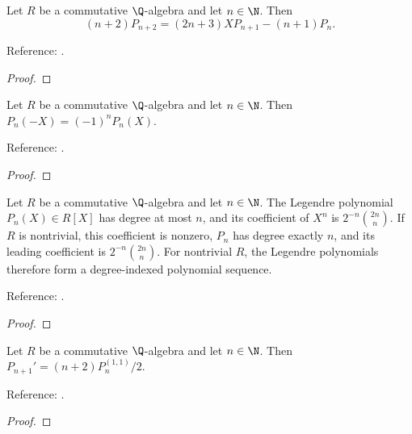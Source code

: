 \begin{theorem}
\label{thm:legendre-recurrence}
\leanok
Let $R$ be a commutative $\Q$-algebra and let $n\in\N$. Then\[(n+2)P_{n+2}=(2n+3)XP_{n+1}-(n+1)P_n.\]

Reference: \cite[18.9.1]{dlmf}.
\end{theorem}
\begin{proof}
\leanok
\end{proof}

\begin{theorem}
\label{thm:legendre-parity}
\leanok
Let $R$ be a commutative $\Q$-algebra and let $n\in\N$. Then $P_n(-X)=(-1)^nP_n(X)$.

Reference: \cite[Table 18.6.1]{dlmf}.
\end{theorem}
\begin{proof}
\leanok
\end{proof}

\begin{theorem}
\label{thm:legendre-degree}
\leanok
Let $R$ be a commutative $\Q$-algebra and let $n\in\N$.
The Legendre polynomial $P_n(X)\in R[X]$ has degree at most $n$, and its coefficient of $X^n$ is
$2^{-n}\binom{2n}{n}$.
If $R$ is nontrivial, this coefficient is nonzero, $P_n$ has degree exactly $n$, and its leading coefficient is $2^{-n}\binom{2n}{n}$.
For nontrivial $R$, the Legendre polynomials therefore form a degree-indexed polynomial sequence.

Reference: \cite[Table 18.3.1]{dlmf}.
\end{theorem}
\begin{proof}
\leanok
\end{proof}

\begin{theorem}
\label{thm:legendre-derivative}
\leanok
Let $R$ be a commutative $\Q$-algebra and let $n\in\N$. Then $P_{n+1}'=(n+2)P_n^{(1,1)}/2$.

Reference: \cite[18.9.15]{dlmf}.
\end{theorem}
\begin{proof}
\leanok
\end{proof}

